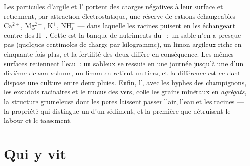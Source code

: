 \begin{proposition}\label{prop:b2:living-soil:cec}
Les particules d'argile et l' portent des charges négatives à leur
surface et retiennent, par attraction électrostatique, une réserve de
cations échangeables --- $\mathrm{Ca^{2+}}$, $\mathrm{Mg^{2+}}$, $\mathrm{K^{+}}$, $\mathrm{NH_4^{+}}$ --- dans
laquelle les racines puisent en les échangeant contre des $\mathrm{H^{+}}$. Cette
\emph{} est la banque de nutriments du ~;
un sable n'en a presque pas (quelques centimoles de charge par
kilogramme), un limon argileux riche en  cinquante fois plus, et la
fertilité des deux diffère en conséquence. Les mêmes surfaces retiennent
l'eau~: un  sableux se ressuie en une journée jusqu'à une
\emph{} d'un dixième de son volume, un limon en retient
un tiers, et la différence est ce dont dispose une culture entre deux
pluies. Enfin, l', avec les hyphes des champignons, les exsudats
racinaires et le mucus des vers, colle les grains minéraux en
\emph{agrégats}, la structure grumeleuse dont les pores laissent passer
l'air, l'eau et les racines --- la propriété qui distingue un  d'un
sédiment, et la première que détruisent le labour et le tassement.
\end{proposition}

\section{Qui y vit}


